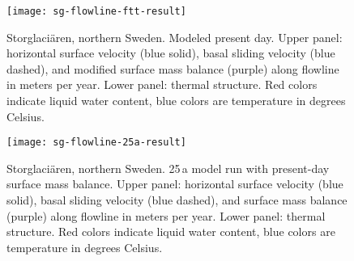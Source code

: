\begin{figure}[ht]
  \centering
  \texttt{[image: sg-flowline-ftt-result]}
  \caption{Storglaci{\"a}ren, northern Sweden.  Modeled present day.  Upper panel: horizontal surface velocity (blue solid), basal sliding velocity (blue dashed), and modified surface mass balance (purple) along flowline in meters per year. Lower panel: thermal structure. Red colors indicate liquid water content, blue colors are temperature in degrees Celsius.}
  \label{fig:storglaciaren-ftt-result}
\end{figure}

\begin{figure}[ht]
  \centering
  \texttt{[image: sg-flowline-25a-result]}
  \caption{Storglaci{\"a}ren, northern Sweden. 25\,a model run with present-day surface mass balance. Upper panel: horizontal surface velocity (blue solid), basal sliding velocity (blue dashed), and surface mass balance (purple) along flowline in meters per year. Lower panel: thermal structure. Red colors indicate liquid water content, blue colors are temperature in degrees Celsius.}
  \label{fig:storglaciaren-25a-result}
\end{figure}
